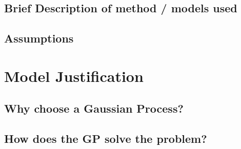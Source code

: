 \documentclass{article}                                                   %
\begin{document}
  \subsection{Brief Description of method / models used}
  \subsection{Assumptions}
\section{Model Justification}
  \subsection{Why choose a Gaussian Process?}
  \subsection{How does the GP solve the problem?}
\end{document}
